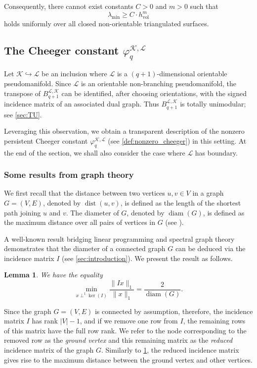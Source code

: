 \documentclass{article}
\newtheorem{lemma}{Lemma}[section]
\newcommand{\KK}{\mathcal{K}}
\newcommand{\LL}{\mathcal{L}}
\newcommand{\dist}{\operatorname{dist}}
\newcommand{\diam}{\operatorname{diam}}
\begin{document}
Consequently, there cannot exist constants \(C>0\) and \(m>0\) such that
\[
    \lambda_{\min}\geq C\cdot h_{\mathrm{vol}}^m
\]
holds uniformly over all closed non-orientable triangulated surfaces.

\subsection{The Cheeger constant \texorpdfstring{$\varphi_q^{\KK,\LL}$}{phi(q) K,L}}
\label{sec:cheeger_phi_psdmfld}
Let $\KK\hookrightarrow \LL$ be an inclusion where $\LL$ is a $(q+1)$-dimensional orientable pseudomanifold. Since \(\LL\) is an orientable non-branching pseudomanifold, the transpose of \(B_{q+1}^{\LL,\KK}\) can be identified, after choosing orientations, with the signed incidence matrix of an associated dual graph. Thus \(B_{q+1}^{\LL,\KK}\) is totally unimodular; see \cref{sec:TU}.

Leveraging this observation, we obtain a transparent description of the nonzero persistent Cheeger constant $\varphi_{q}^{\KK, \LL}$ (see \cref{def:nonzero_cheeger}) in this setting. At the end of the section, we shall also consider the case where $\LL$ has boundary.

\subsubsection{Some results from graph theory}
We first recall that the distance between two vertices $u, v\in V$ in a graph $G=(V, E)$, denoted by $\dist(u, v)$, is defined as the length of the shortest path joining $u$ and $v$. The diameter of $G$, denoted by $\diam(G)$, is defined as the maximum distance over all pairs of vertices in $G$ (see \cite[Chapter 3]{MR1421568}).

A well-known result bridging linear programming and spectral graph theory demonstrates that the diameter of a connected graph $G$ can be deduced via the incidence matrix $I$ (see \cref{sec:introduction}).
We present the result as follows.

\begin{lemma}\label{lemma:ungrd_graph_diam}
We have the equality
\begin{equation}\label{eq:ungrd_graph_diam}
\min_{x\perp^1\ker(I)}\frac{\|Ix\|_1}{\|x\|_1}=
\frac{2}{\diam(G)}.
\end{equation}
\end{lemma}

Since the graph $G=(V, E)$ is connected by assumption,
therefore,
the incidence matrix $I$ has rank $|V|-1$, 
and if we remove one row from $I$, 
the remaining rows of this matrix have the full row rank.
We refer to the node corresponding to the removed row as the \emph{ground vertex} and this remaining matrix as the \emph{reduced} incidence matrix of the graph $G$.
Similarly to \cref{lemma:ungrd_graph_diam},
the reduced incidence matrix gives rise to the maximum distance between the ground vertex and other vertices.  
\end{document}
